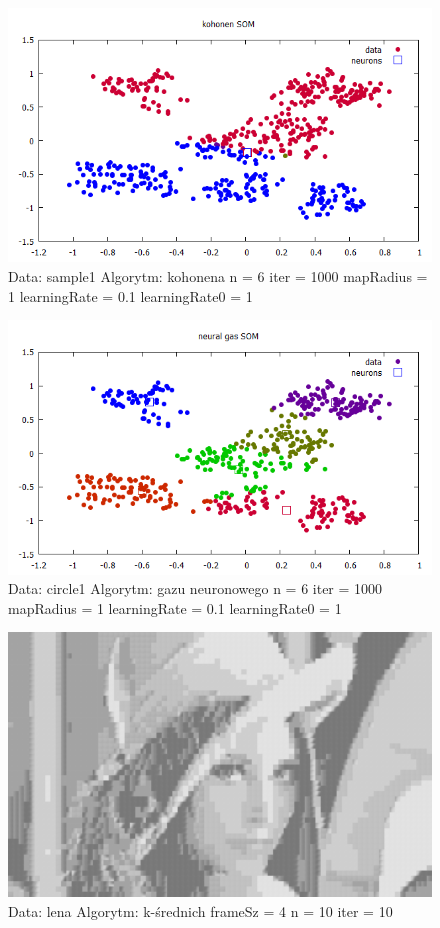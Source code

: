 \documentclass{classrep}
\begin{document}
{{{\newpage


\begin{figure}[h!]
\centering
 \includegraphics[width=12cm]{img/kohonensample1_6_1000.png}
 \vspace{-0.3cm}
 \caption{Data: sample1 Algorytm: kohonena n = 6 iter = 1000
  mapRadius = 1 learningRate = 0.1 learningRate0 = 1  
}
\end{figure}

\newpage

\begin{figure}[h!]
\centering
 \includegraphics[width=12cm]{img/neuralsample1_6_1000.png}
 \vspace{-0.3cm}
 \caption{Data: circle1 Algorytm: gazu neuronowego n = 6 iter = 1000
  mapRadius = 1 learningRate = 0.1 learningRate0  = 1  
}
\end{figure}

\begin{figure}[h!]
\centering
 \includegraphics[width=12cm]{img/kmeans_1.png}
 \vspace{-0.0cm}
 \caption{Data: lena Algorytm: k-średnich frameSz = 4 n = 10 iter = 10
}
\end{figure}

}}}
\end{document}
